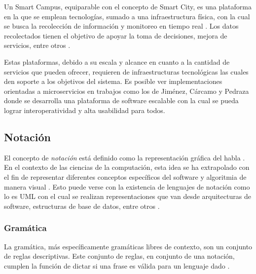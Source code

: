 \documentclass[12pt]{article}
\begin{document}
    Un Smart Campus, equiparable con el concepto de Smart City, es una plataforma en la que se emplean tecnologías, sumado a una infraestructura física, con la cual se busca la recolección de información y monitoreo en tiempo real \cite{MinAllah2020}. Los datos recolectados tienen el objetivo de apoyar la toma de decisiones, mejora de servicios, entre otros \cite{Anagnostopoulos_2023}.

    Estas plataformas, debido a su escala y alcance en cuanto a la cantidad de servicios que pueden ofrecer, requieren de 
    infraestructuras tecnológicas las cuales den soporte a los objetivos del sistema. Es posible ver implementaciones orientadas a microservicios en trabajos como los de Jiménez, Cárcamo y Pedraza \citeyear{henry_2020} donde se desarrolla una plataforma de software escalable con la cual se pueda lograr interoperatividad y alta usabilidad para todos.


    \subsection{Notación} %



    El concepto de \textit{notación} está definido como la representación gráfica del habla \cite{crystal2011dictionary}. En el contexto de las ciencias de la computación, esta idea se ha extrapolado con el fin de representar diferentes conceptos específicos del software y algoritmia de manera visual \cite{RutanenKalle2018McoO}. Esto puede verse con la existencia de lenguajes de notación como lo es UML con el cual se realizan representaciones que van desde arquitecturas de software, estructuras de base de datos, entre otros \cite{Booch2005-xu}.
    
    \subsubsection*{Gramática}


    La gramática, más específicamente gramáticas libres de contexto, son un conjunto de reglas descriptivas. Este conjunto de reglas, en conjunto de una notación, cumplen la función de dictar si una frase es válida para un lenguaje dado \cite[p. 101]{Sipser2012-wl}. 
\end{document}
